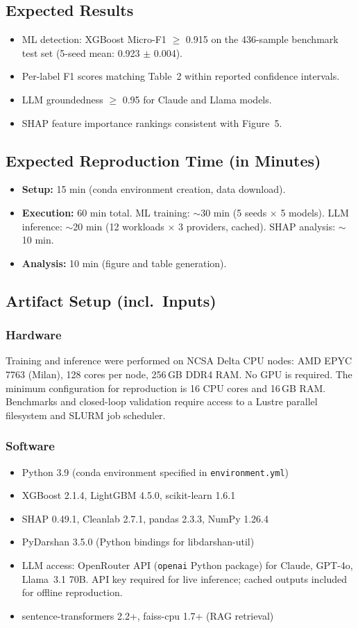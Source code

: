 \documentclass[conference]{IEEEtran}
\newcommand{\artexp}{\subsection*{Expected Results}}
\newcommand{\arttime}{\subsection*{Expected Reproduction Time (in Minutes)}}
\newcommand{\artin}{\subsection*{Artifact Setup (incl.\ Inputs)}}
\newcommand{\artinpart}[1]{\subsubsection*{#1}}
\begin{document}
\artexp
\begin{itemize}
\item ML detection: XGBoost Micro-F1 $\geq$ 0.915 on the 436-sample
benchmark test set (5-seed mean: 0.923 $\pm$ 0.004).
\item Per-label F1 scores matching Table~2 within reported confidence
intervals.
\item LLM groundedness $\geq$ 0.95 for Claude and Llama models.
\item SHAP feature importance rankings consistent with Figure~5.
\end{itemize}

\arttime
\begin{itemize}
\item \textbf{Setup:} 15 min (conda environment creation, data download).
\item \textbf{Execution:} 60 min total. ML training: $\sim$30 min (5 seeds
$\times$ 5 models). LLM inference: $\sim$20 min (12 workloads $\times$ 3
providers, cached). SHAP analysis: $\sim$10 min.
\item \textbf{Analysis:} 10 min (figure and table generation).
\end{itemize}

\artin

\artinpart{Hardware}
Training and inference were performed on NCSA Delta CPU nodes:
AMD EPYC 7763 (Milan), 128 cores per node, 256\,GB DDR4 RAM.
No GPU is required. The minimum configuration for reproduction is
16 CPU cores and 16\,GB RAM.
Benchmarks and closed-loop validation require access to a Lustre
parallel filesystem and SLURM job scheduler.

\artinpart{Software}
\begin{itemize}
\item Python 3.9 (conda environment specified in \texttt{environment.yml})
\item XGBoost 2.1.4, LightGBM 4.5.0, scikit-learn 1.6.1
\item SHAP 0.49.1, Cleanlab 2.7.1, pandas 2.3.3, NumPy 1.26.4
\item PyDarshan 3.5.0 (Python bindings for libdarshan-util)
\item LLM access: OpenRouter API (\texttt{openai} Python package) for
Claude, GPT-4o, Llama~3.1 70B. API key required for live inference;
cached outputs included for offline reproduction.
\item sentence-transformers 2.2+, faiss-cpu 1.7+ (RAG retrieval)
\end{itemize}
\end{document}
